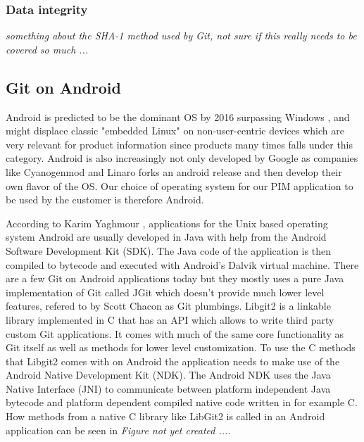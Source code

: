 \documentclass[12pt,a4paper]{article}
\begin{document}
\subsubsection{Data integrity}
\emph{something about the SHA-1 method used by Git, not sure if this really needs to be covered so much ...}


\subsection{Git on Android}
Android is predicted to be the dominant OS by 2016 surpassing Windows \citep{android}, and might displace classic "embedded Linux" on non-user-centric devices which are very relevant for product information since products many times falls under this category. Android is also increasingly not only developed by Google as companies like Cyanogenmod and Linaro forks an android release and then develop their own flavor of the OS. Our choice of operating system for our PIM application to be used by the customer is therefore Android.

According to Karim Yaghmour \citep{android}, applications for the Unix based operating system Android are usually developed in Java with help from the Android Software Development Kit (SDK). The Java code of the application is then compiled to bytecode and executed with Android's Dalvik virtual machine. There are a few Git on Android applications today but they mostly uses a pure Java implementation of Git called JGit which doesn't provide much lower level features, refered to by Scott Chacon \citep{progit} as Git plumbings. Libgit2 is a linkable library implemented in C that has an API which allows to write third party custom Git applications. It comes with much of the same core functionality as Git itself as well as methods for lower level customization. To use the C methods that Libgit2 comes with on Android the application needs to make use of the Android Native Development Kit (NDK). The Android NDK uses the Java Native Interface (JNI) to communicate between platform independent Java bytecode and platform dependent compiled native code written in for example C. How methods from a native C library like LibGit2 is called in an Android application can be seen in \emph{Figure not yet created ...}. 
\end{document}
